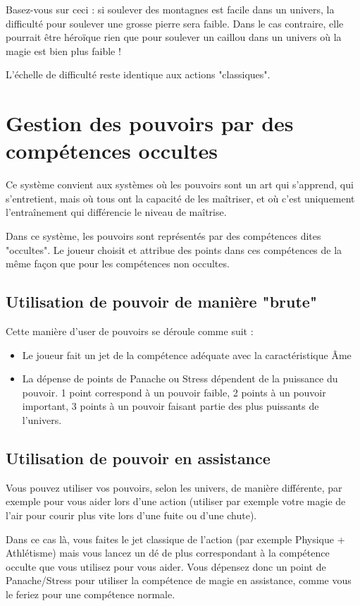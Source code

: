 \documentclass{conf/FusinaClass}
\begin{document}
Basez-vous sur ceci : si soulever des montagnes est facile dans un univers, la difficulté pour soulever une grosse pierre sera faible. Dans le cas contraire, elle pourrait être héroïque rien que pour soulever un caillou dans un univers où la magie est bien plus faible !

L'échelle de difficulté reste identique aux actions "classiques".

\chapter{Gestion des pouvoirs par des compétences occultes}
Ce système convient aux systèmes où les pouvoirs sont un art qui s'apprend, qui s'entretient, mais où tous ont la capacité de les maîtriser, et où c'est uniquement l'entraînement qui différencie le niveau de maîtrise.

Dans ce système, les pouvoirs sont représentés par des compétences dites "occultes". Le joueur choisit et attribue des points dans ces compétences de la même façon que pour les compétences non occultes. 

\section{Utilisation de pouvoir de manière "brute"}
Cette manière d'user de pouvoirs se déroule comme suit : 

\begin{itemize}
\item Le joueur fait un jet de la compétence adéquate avec la caractéristique Âme
\item La dépense de points de Panache ou Stress dépendent de la puissance du pouvoir. 1 point correspond à un pouvoir faible, 2 points à un pouvoir important, 3 points à un pouvoir faisant partie des plus puissants de l'univers.
\end{itemize}

\section{Utilisation de pouvoir en assistance}
Vous pouvez utiliser vos pouvoirs, selon les univers, de manière différente, par exemple pour vous aider lors d'une action (utiliser par exemple votre magie de l'air pour courir plus vite lors d'une fuite ou d'une chute).

Dans ce cas là, vous faites le jet classique de l'action (par exemple Physique + Athlétisme) mais vous lancez un dé de plus correspondant à la compétence occulte que vous utilisez pour vous aider. Vous dépensez donc un point de Panache/Stress pour utiliser la compétence de magie en assistance, comme vous le feriez pour une compétence normale.
\end{document}
